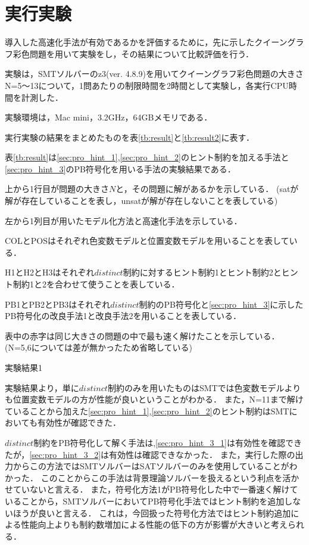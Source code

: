 \chapter{実行実験}

導入した高速化手法が有効であるかを評価するために，先に示したクイーングラフ彩色問題を用いて実験をし，その結果について比較評価を行う．

実験は，SMTソルバーのz3(ver. 4.8.9)を用いてクイーングラフ彩色問題の大きさN=5〜13について，1問あたりの制限時間を2時間として実験し，各実行CPU時間を計測した．

実験環境は，Mac mini，3.2GHz，64GBメモリである．

実行実験の結果をまとめたものを表\ref{tb:result}と\ref{tb:result2}に表す．

表\ref{tb:result}は\ref{sec:pro_hint_1},\ref{sec:pro_hint_2}のヒント制約を加える手法と\ref{sec:pro_hint_3}のPB符号化を用いる手法の実験結果である．

上から1行目が問題の大きさ$N$と，その問題に解があるかを示している．
(satが解が存在していることを表し，unsatが解が存在しないことを表している)

左から1列目が用いたモデル化方法と高速化手法を示している．

COLとPOSはそれぞれ色変数モデルと位置変数モデルを用いることを表している．

H1とH2とH3はそれぞれ$distinct$制約に対するヒント制約1とヒント制約2とヒント制約1と2を合わせて使うことを表している．

PB1とPB2とPB3はそれぞれ$distinct$制約のPB符号化と\ref{sec:pro_hint_3}に示したPB符号化の改良手法1と改良手法2を用いることを表している．

表中の赤字は同じ大きさの問題の中で最も速く解けたことを示している．
(N=5,6については差が無かったため省略している)

\begin{table}[htb]
    \caption{実験結果1}
{\tiny \label{tb:result}}
\end{table}

実験結果より，単に$distinct$制約のみを用いたものはSMTでは色変数モデルよりも位置変数モデルの方が性能が良いということがわかる．
また，N=11まで解けていることから加えた\ref{sec:pro_hint_1},\ref{sec:pro_hint_2}のヒント制約はSMTにおいても有効性が確認できた．

$distinct$制約をPB符号化して解く手法は,\ref{sec:pro_hint_3_1}は有効性を確認できたが，\ref{sec:pro_hint_3_2}は有効性は確認できなかった．
また，実行した際の出力からこの方法ではSMTソルバーはSATソルバーのみを使用していることがわかった．
このことからこの手法は背景理論ソルバーを扱えるという利点を活かせていないと言える．
また，符号化方法1がPB符号化した中で一番速く解けていることから，SMTソルバーにおいてPB符号化手法ではヒント制約を追加しないほうが良いと言える．
これは，今回扱った符号化方法ではヒント制約追加による性能向上よりも制約数増加による性能の低下の方が影響が大きいと考えられる．

